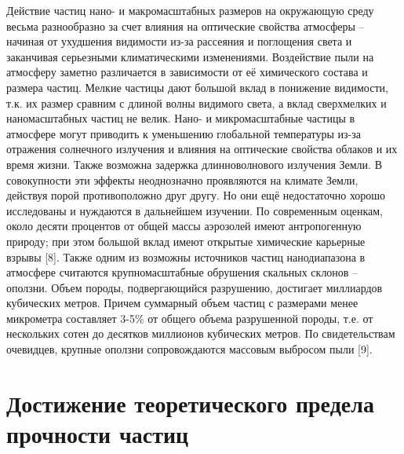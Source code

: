 Действие частиц нано- и макромасштабных размеров на окружающую среду весьма разнообразно за счет влияния на оптические свойства атмосферы – начиная от ухудшения видимости из-за рассеяния и поглощения света и заканчивая серьезными климатическими изменениями. Воздействие пыли на атмосферу заметно различается в зависимости от её химического состава и размера частиц.
Мелкие частицы дают большой вклад в понижение видимости, т.к. их размер сравним с длиной волны видимого света, а вклад сверхмелких и наномасштабных частиц не велик.
Нано- и микромасштабные частицы в атмосфере могут приводить к уменьшению глобальной температуры из-за отражения солнечного излучения и влияния на оптические  свойства облаков и их время жизни. Также возможна задержка длинноволнового излучения Земли. 
В совокупности эти эффекты неоднозначно проявляются на климате Земли, действуя порой противоположно друг другу. Но они ещё недостаточно хорошо исследованы и нуждаются в дальнейшем изучении.
По современным оценкам, около десяти процентов от общей массы аэрозолей имеют антропогенную природу; при этом большой вклад имеют открытые химические карьерные взрывы [8]. Также одним из возможны источников частиц нанодиапазона в атмосфере считаются крупномасштабные обрушения скальных склонов – оползни. Объем породы, подвергающийся разрушению, достигает миллиардов кубических метров. Причем суммарный объем частиц с размерами менее микрометра составляет 3-5\% от общего объема разрушенной породы, т.е. от нескольких сотен до десятков миллионов кубических метров. По свидетельствам очевидцев, крупные оползни сопровождаются массовым выбросом пыли [9].

\section{Достижение теоретического предела прочности частиц} \label{sect1_2}

